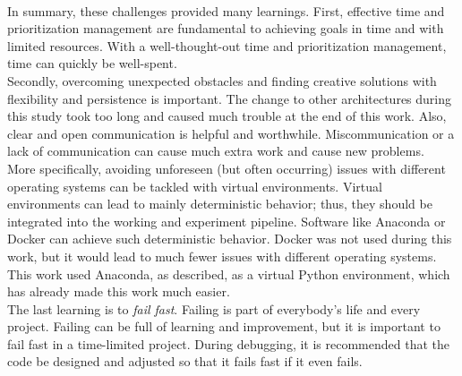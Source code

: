 		\\
		In summary, these challenges provided many learnings. First, effective time and prioritization management are fundamental to achieving goals in time and with limited resources. With a well-thought-out time and prioritization management, time can quickly be well-spent.\\
		Secondly, overcoming unexpected obstacles and finding creative solutions with flexibility and persistence is important. The change to other architectures during this study took too long and caused much trouble at the end of this work. Also, clear and open communication is helpful and worthwhile. Miscommunication or a lack of communication can cause much extra work and cause new problems. \\
		More specifically, avoiding unforeseen (but often occurring) issues with different operating systems can be tackled with virtual environments. Virtual environments can lead to mainly deterministic behavior; thus, they should be integrated into the working and experiment pipeline. Software like Anaconda or Docker can achieve such deterministic behavior. Docker was not used during this work, but it would lead to much fewer issues with different operating systems. This work used Anaconda, as described, as a virtual Python environment, which has already made this work much easier.\\
		The last learning is to \textit{fail fast}. Failing is part of everybody's life and every project. Failing can be full of learning and improvement, but it is important to fail fast in a time-limited project. During debugging, it is recommended that the code be designed and adjusted so that it fails fast if it even fails.
		
		
	
	
	
	
	
	


